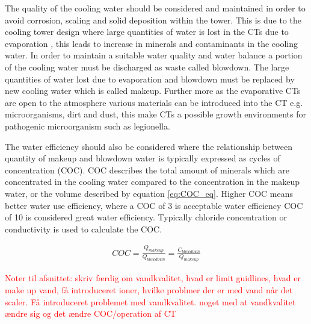 The quality of the cooling water should be considered and maintained in order to avoid corrosion, scaling and solid deposition within the tower.  \citep{IntroductionCoolingTower2014}
This is due to the cooling tower design where large quantities of water is lost in the CTs due to evaporation %
\citep{farahanniRecoveryCoolingTower_2016}, this leads to increase in minerals and contaminants in the cooling water. 
In order to maintain a suitable water quality and water balance a portion of the cooling water must be discharged as waste called blowdown. \citep{IntroductionCoolingTower2014}
The large quantities of water lost due to evaporation and blowdown must be replaced by new cooling water which is called makeup. %
\citep{farahanniRecoveryCoolingTower_2016}
Further more as the evaporative CTs are open to the atmosphere various  materials can be introduced into the CT e.g. microorganisms, dirt and dust, this make CTs a possible growth environments for pathogenic microorganism such as legionella.  \citep{IntroductionCoolingTower2014} %


The water efficiency should also be considered where the relationship between quantity of makeup and blowdown water is typically expressed as cycles of concentration (COC). 
COC describes the total amount of minerals which are concentrated in the cooling water compared to the concentration in the makeup water, or the volume described by equation \ref{eq:COC_eq}. \citep{IntroductionCoolingTower2014}
Higher COC means better water use efficiency, where a COC of 3 is acceptable water efficiency COC of 10 is considered great water efficiency. %
Typically chloride concentration or conductivity is used to calculate the COC. 
\citep{IntroductionCoolingTower2014}


\begin{ceqn}
    \begin{align}
    \label{eq:rejection_formula}
       COC = \frac{ Q_{makeup}}{ Q_{blowdown}}= \frac{ C_{blowdown}}{Q_{makeup}}
    \end{align}
    \label{eq:COC_eq}
\end{ceqn}

\textcolor{red}{Noter til afsnittet: skriv færdig om vandkvalitet, hvad er limit guidlines, hvad er make up vand, få introduceret ioner, hvilke problmer der er med vand når det scaler. Få introduceret problemet med vandkvalitet. noget med at vandkvalitet ændre sig og det ændre COC/operation af CT}



